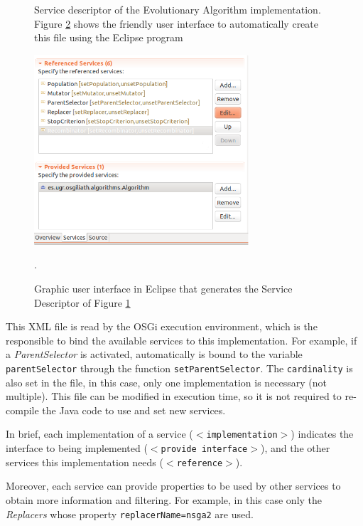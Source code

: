 \begin{figure}
\usebox{\mintedboxDS}
\caption{Service descriptor of the Evolutionary Algorithm implementation.  Figure \ref{fig:xmlgui} shows the friendly user interface to automatically create this file using the Eclipse program} 
\label{fig:dsevo} 
\end{figure}

\begin{figure}
\centering
\includegraphics[width=8cm]{gfx/osgiliath/eclipse.png}

\caption{Graphic user interface in Eclipse that generates the Service Descriptor of Figure \ref{fig:dsevo} }.
\label{fig:xmlgui}
\end{figure}



This XML file is read by the OSGi execution environment, which is the
responsible to bind the available services to this implementation. For
example, if a {\em ParentSelector} is activated, automatically is
bound to the variable \texttt{ parentSelector} through the function \texttt{setParentSelector}. The \texttt{cardinality} is also set in the file,
in this case, only one implementation is necessary (not
multiple). This file can be modified in execution time, so it is not
required to re-compile the Java code to use and set new services. %

In brief, each implementation of a service (\texttt{$<$im\-ple\-men\-ta\-tion$>$}) indicates the interface to being implemented (\texttt{$<$pro\-vi\-de in\-ter\-fa\-ce$>$}), and the other services this implementation needs (\texttt{$<$re\-fe\-ren\-ce$>$}). 

Moreover, each service can provide properties to be used by other
services to obtain more information and filtering. For example, in
this case only the {\em Replacers} whose property \texttt{replacerName=nsga2} are used. 


